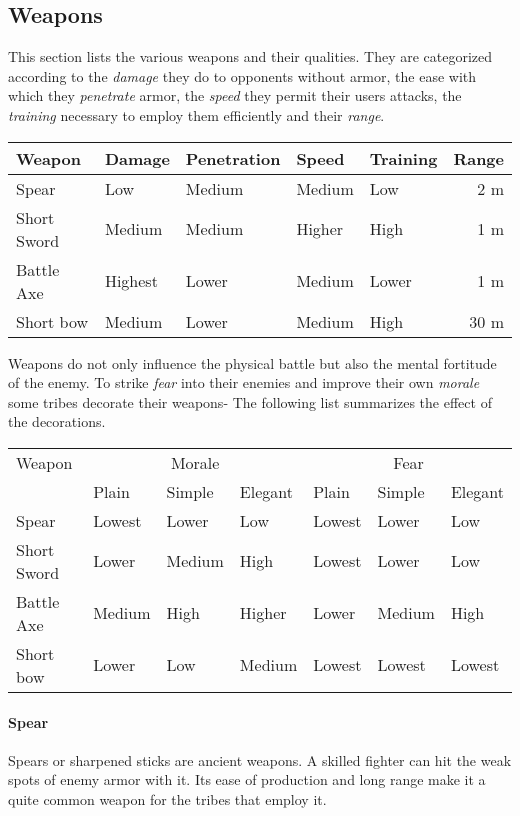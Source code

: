 \documentclass[a4paper]{book}
\begin{document}
	\subsection{Weapons}
		This section lists the various weapons and their qualities.
		They are categorized according to the \emph{damage} they do to opponents
		without armor,
		the ease with which they \emph{penetrate} armor,
		the \emph{speed} they permit their users attacks,
		the \emph{training} necessary to employ them efficiently
		and their \emph{range}.

		\begin{longtable}{lllllr}
			\toprule
			Weapon 
			& Damage & Penetration 
			& Speed & Training & Range \\
			\midrule
			Spear 
			& Low & Medium 
			& Medium & Low & 2 m \\
			Short Sword 
			& Medium & Medium
			& Higher & High & 1 m \\
		Battle Axe 
		& Highest & Lower
		& Medium & Lower & 1 m \\
		Short bow
		& Medium & Lower &
		Medium & High & 30 m\\
		\bottomrule
	\end{longtable}

	Weapons do not only influence the physical battle but also the mental fortitude
	of the enemy.
	To strike \emph{fear} into their enemies and improve their own \emph{morale}
	some tribes decorate their weapons-
	The following list summarizes the effect of the decorations.

	\begin{longtable}{l ll ll ll}
		\toprule
		Weapon 
		& \multicolumn{3}{c}{Morale}
		& \multicolumn{3}{c}{Fear}
		\\
		& Plain & Simple & Elegant
		& Plain & Simple & Elegant \\
		\midrule
		Spear 
		& Lowest & Lower & Low
		& Lowest & Lower & Low \\
		Short Sword 
		& Lower & Medium & High
		& Lowest & Lower & Low \\
		Battle Axe 
		& Medium & High & Higher
		& Lower & Medium & High \\
		Short bow
		& Lower & Low & Medium
		& Lowest & Lowest & Lowest \\
		\bottomrule
	\end{longtable}

	\paragraph{Spear}
	Spears or sharpened sticks are ancient weapons.
	A skilled fighter can hit the weak spots of enemy armor with it.
	Its ease of production and long range make it a quite common weapon
	for the tribes that employ it.
\end{document}
